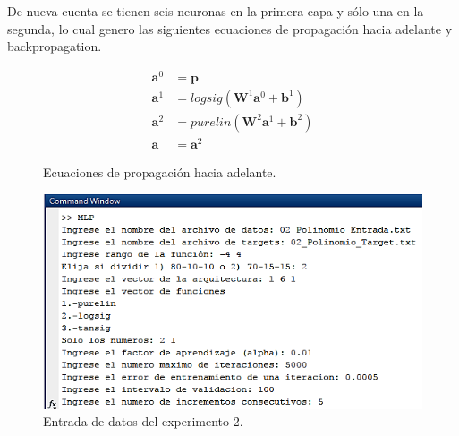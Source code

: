 De nueva cuenta se tienen seis neuronas en la primera capa y sólo una en la segunda, lo cual genero las siguientes ecuaciones de propagación hacia adelante y backpropagation.

\begin{figure}[H]
    \begin{align*}
    \boldsymbol{a}^0 &= \boldsymbol{p} \\
    \boldsymbol{a}^{1} &= logsig(\boldsymbol{W}^{1}\boldsymbol{a}^{0}+\boldsymbol{b}^{1}
    ) \\
    \boldsymbol{a}^{2} &= purelin(\boldsymbol{W}^{2}\boldsymbol{a}^{1}+\boldsymbol{b}^{2}
    ) \\
    \boldsymbol{a} &= \boldsymbol{a}^{2}
    \end{align*}
    \caption{Ecuaciones de propagación hacia adelante.}
\end{figure}

\begin{figure}[H]
    \begin{center}
        \includegraphics[width=12cm]{2/entrada.png}
        \caption{Entrada de datos del experimento 2.}
        \label{fig:entrada2}
    \end{center}
\end{figure}

